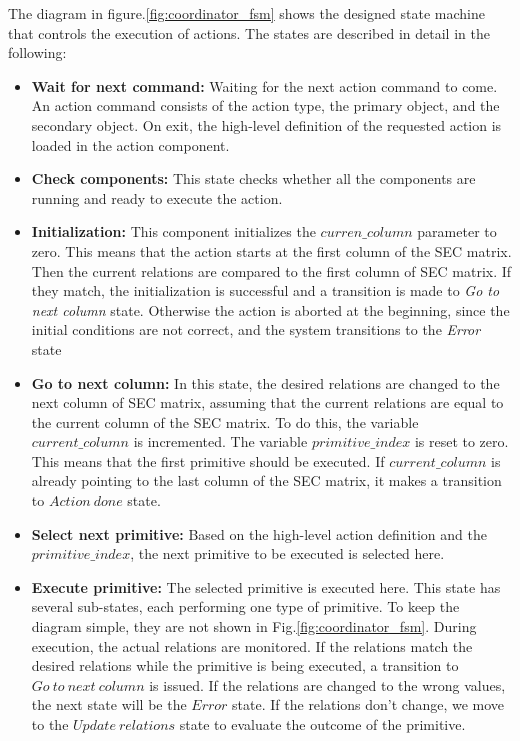The diagram in figure.\ref{fig:coordinator_fsm} shows the designed state machine that controls the execution of actions.
The states are described in detail in the following:
\begin{itemize}
 \item \textbf{Wait for next command:} Waiting for the next action command to come.
 An action command consists of the action type, the primary object, and the secondary object.
 On exit, the high-level definition of the requested action is loaded in the action component.
 \item \textbf{Check components:} This state checks whether all the components are running and ready to execute the action. 
 \item \textbf{Initialization:} This component initializes the $curren\_column$ parameter to zero.
 This means that the action starts at the first column of the SEC matrix.
 Then the current relations are compared to the first column of SEC matrix.
 If they match, the initialization is successful and a transition is made to \textit{Go to next column} state.
 Otherwise the action is aborted at the beginning, since the initial conditions are not correct, and the system transitions to the \textit{Error} state
 \item \textbf{Go to next column:} In this state, the desired relations are changed to the next column of SEC matrix,
 assuming that the current relations are equal to the current column of the SEC matrix.
 To do this, the variable $current\_column$ is incremented.
 The variable $primitive\_index$ is reset to zero. This means that the first primitive should be executed.
 If $current\_column$ is already pointing to the last column of the SEC matrix, it makes a transition to $Action\ done$ state.
 \item \textbf{Select next primitive:} Based on the high-level action definition and the $primitive\_index$,
 the next primitive to be executed is selected here.
 \item \textbf{Execute primitive:} The selected primitive is executed here.
 This state has several sub-states, each performing one type of primitive.
 To keep the diagram simple, they are not shown in Fig.\ref{fig:coordinator_fsm}.
 During execution, the actual relations are monitored.
 If the relations match the desired relations while the primitive is being executed, a transition to $Go\ to\ next\ column$ is issued.
 If the relations are changed to the wrong values, the next state will be the $Error$ state.
 If the relations don't change, we move to the $Update\ relations$ state to evaluate the outcome of the primitive.
 

\end{itemize}
